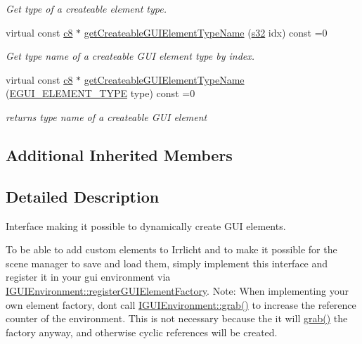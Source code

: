 \begin{DoxyCompactItemize}
\begin{DoxyCompactList}\small\item\em Get type of a createable element type. \end{DoxyCompactList}\item 
virtual const \hyperlink{namespaceirr_a9395eaea339bcb546b319e9c96bf7410}{c8} $\ast$ \hyperlink{classirr_1_1gui_1_1IGUIElementFactory_aa8007c17ea40b74666c1d04c9d4de85f}{get\+Createable\+G\+U\+I\+Element\+Type\+Name} (\hyperlink{namespaceirr_ac66849b7a6ed16e30ebede579f9b47c6}{s32} idx) const =0
\begin{DoxyCompactList}\small\item\em Get type name of a createable G\+UI element type by index. \end{DoxyCompactList}\item 
virtual const \hyperlink{namespaceirr_a9395eaea339bcb546b319e9c96bf7410}{c8} $\ast$ \hyperlink{classirr_1_1gui_1_1IGUIElementFactory_a1e692e1f746ee69815bf25981ee0facf}{get\+Createable\+G\+U\+I\+Element\+Type\+Name} (\hyperlink{namespaceirr_1_1gui_ae4d66df0ecf4117cdbcf9f22404bd254}{E\+G\+U\+I\+\_\+\+E\+L\+E\+M\+E\+N\+T\+\_\+\+T\+Y\+PE} type) const =0
\begin{DoxyCompactList}\small\item\em returns type name of a createable G\+UI element \end{DoxyCompactList}\end{DoxyCompactItemize}
\subsection*{Additional Inherited Members}


\subsection{Detailed Description}
Interface making it possible to dynamically create G\+UI elements. 

To be able to add custom elements to Irrlicht and to make it possible for the scene manager to save and load them, simply implement this interface and register it in your gui environment via \hyperlink{classirr_1_1gui_1_1IGUIEnvironment_a653ac2cc8640899c23f4d55d9a5f0fdd}{I\+G\+U\+I\+Environment\+::register\+G\+U\+I\+Element\+Factory}. Note\+: When implementing your own element factory, don\textquotesingle{}t call \hyperlink{classirr_1_1IReferenceCounted_a396f9cdbe311ada278626477b3c6f0f5}{I\+G\+U\+I\+Environment\+::grab()} to increase the reference counter of the environment. This is not necessary because the it will \hyperlink{classirr_1_1IReferenceCounted_a396f9cdbe311ada278626477b3c6f0f5}{grab()} the factory anyway, and otherwise cyclic references will be created. 

